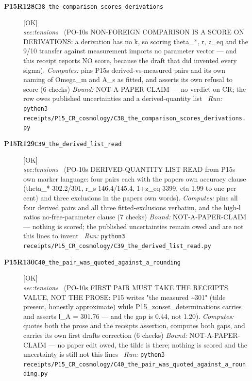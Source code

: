 \begin{description}
\item[\textbf{P15R128}\quad\texttt{C38\_the\_comparison\_scores\_derivations}]\hfill\textsf{[OK]}\\
\textit{sec:tensions} \ (PO-10s NON-FOREIGN COMPARISON IS A SCORE ON DERIVATIONS: a derivation has no k, so scoring theta\_*, r, z\_eq and the 9/10 transfer against measurement imports no parameter vector --- and this receipt reports NO score, because the draft that did invented every sigma). 
\emph{Computes:} pins P15s derived-vs-measured pairs and its own naming of Omega\_m and A\_s as fitted, and asserts its own refusal to score (6 checks)
 \emph{Bound:} NOT-A-PAPER-CLAIM --- no verdict on CR; the row owes published uncertainties and a derived-quantity list
\ \emph{Run:} \texttt{python3 receipts/P15\_CR\_cosmology/C38\_the\_comparison\_scores\_derivations.py}
\item[\textbf{P15R129}\quad\texttt{C39\_the\_derived\_list\_read}]\hfill\textsf{[OK]}\\
\textit{sec:tensions} \ (PO-10s DERIVED-QUANTITY LIST READ from P15s own marker language: four pairs each with the papers own accuracy clause (theta\_* 302.2/301, r\_s 146.4/145.4, 1+z\_eq 3399, eta 1.99 to one per cent) and three exclusions in the papers own words). 
\emph{Computes:} pins all four derived pairs and all three fitted-exclusions verbatim, and the high-l ratios no-free-parameter clause (7 checks)
 \emph{Bound:} NOT-A-PAPER-CLAIM --- nothing is scored; the published uncertainties remain owed and are not this lines to invent
\ \emph{Run:} \texttt{python3 receipts/P15\_CR\_cosmology/C39\_the\_derived\_list\_read.py}
\item[\textbf{P15R130}\quad\texttt{C40\_the\_pair\_was\_quoted\_against\_a\_rounding}]\hfill\textsf{[OK]}\\
\textit{sec:tensions} \ (PO-10s FIRST PAIR MUST TAKE THE RECEIPTS VALUE, NOT THE PROSE: P15 writes "the measured \textasciitilde{}301" (tilde present, honestly approximate) while P15\_zonset\_determinations carries and asserts l\_A = 301.76 --- and the gap is 0.44, not 1.20). 
\emph{Computes:} quotes both the prose and the receipts assertion, computes both gaps, and carries its own first drafts correction (6 checks)
 \emph{Bound:} NOT-A-PAPER-CLAIM --- no paper edit owed, the tilde is there; nothing is scored and the uncertainty is still not this lines
\ \emph{Run:} \texttt{python3 receipts/P15\_CR\_cosmology/C40\_the\_pair\_was\_quoted\_against\_a\_rounding.py}

\end{description}
